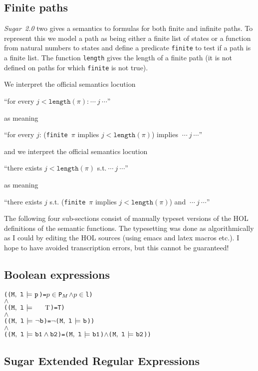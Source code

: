 \documentclass{llncs}
\newcommand{\And}{\(\wedge\)}
\newcommand{\Not}{\(\neg\)}
\newcommand{\In}{\(\in\)}
\newcommand{\T}{\texttt{\small\rm{T}}}
\newcommand{\bTrue}{\T}
\newcommand{\BSem}[3]{(\(\tt#1,~#2~{\models}~#3\))}
\newcommand{\bProp}[1]{#1}
\newcommand{\bNot}[1]{\neg#1}
\newcommand{\bAnd}[2]{#1\wedge#2}
\newcommand\Sugar{{\it{Sugar~2.0}}\xspace}
\renewcommand{\t}[1]{\texttt{#1}}
\begin{document}
\subsection{Finite paths}\label{finite}

\Sugar two gives a semantics to formulas for both finite and infinite
paths.  To represent this we model a path as being either a finite
list of states or a function from natural numbers to states and define a
predicate \t{finite} to test if a path is a finite list. The function
\t{length} gives the length of a finite path (it is not defined on
paths for which \t{finite} is not true).

\noindent We interpret the official semantics locution 

``for every $j < \t{length}(\pi)$:$~\cdots~j~\cdots$''

\noindent as meaning 

``for every $j$: (\t{finite}~$\pi$ implies $j < \t{length}(\pi)$) implies $~\cdots~j~\cdots$''

\noindent and we interpret the official semantics locution 

``there exists $j < \t{length}(\pi)$ s.t.$~\cdots~j~\cdots$''

\noindent as meaning 

``there exists $j$ s.t. (\t{finite}~$\pi$ implies $j < \t{length}(\pi)$) and $~\cdots~j~\cdots$''


The following four sub-sections  consist of manually
typeset versions of the HOL definitions of the semantic functions. The
typesetting was done as algorithmically as I could by editing the HOL
sources (using emacs and latex macros etc.). I hope to have avoided
transcription errors, but this cannot be guaranteed!

\subsection{Boolean expressions}


{\begin{alltt}
   ({\BSem{M}{l}{\bProp{p}}}     = \(p\) {\In} P\(\sb{M}\) {\And} \(p\) {\In} l)
   {\And}
   ({\BSem{M}{l}{\bTrue}}     = T)
   {\And}
   ({\BSem{M}{l}{{\bNot{b}}}}    = {\Not}{\BSem{M}{l}{b}})
   {\And}
   ({\BSem{M}{l}{\bAnd{b1}{b2}}} = {\BSem{M}{l}{b1}} {\And} {\BSem{M}{l}{b2}})
\end{alltt}}

\subsection{Sugar Extended Regular Expressions}\label{FullSERE}
\end{document}
